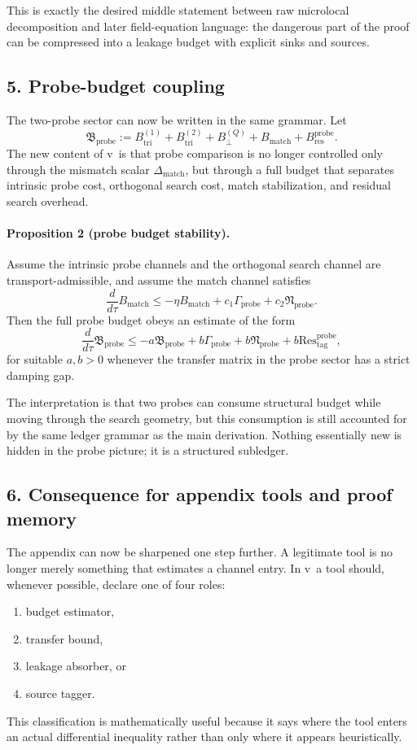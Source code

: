 This is exactly the desired middle statement between raw microlocal decomposition
and later field-equation language: the dangerous part of the proof can be
compressed into a leakage budget with explicit sinks and sources.

\subsection*{5. Probe-budget coupling}
The two-probe sector can now be written in the same grammar. Let
\[
\mathfrak B_{\mathrm{probe}}:=
B_{\mathrm{tri}}^{(1)}+B_{\mathrm{tri}}^{(2)}+B_{\perp}^{(Q)}+B_{\mathrm{match}}+B_{\mathrm{res}}^{\mathrm{probe}}.
\]
The new content of v\docversion\ is that probe comparison is no longer controlled
only through the mismatch scalar $\Delta_{\mathrm{match}}$, but through a full budget
that separates intrinsic probe cost, orthogonal search cost, match stabilization,
and residual search overhead.

\paragraph{Proposition 2 (probe budget stability).}
Assume the intrinsic probe channels and the orthogonal search channel are
transport-admissible, and assume the match channel satisfies
\[
\frac{d}{d\tau}B_{\mathrm{match}}
\le -\eta B_{\mathrm{match}} + c_1\Gamma_{\mathrm{probe}} + c_2\mathfrak N_{\mathrm{probe}}.
\]
Then the full probe budget obeys an estimate of the form
\[
\frac{d}{d\tau}\mathfrak B_{\mathrm{probe}}
\le -a\mathfrak B_{\mathrm{probe}} + b\Gamma_{\mathrm{probe}} + b\mathfrak N_{\mathrm{probe}} + b\mathrm{Res}^{\mathrm{probe}}_{\mathrm{tag}},
\]
for suitable $a,b>0$ whenever the transfer matrix in the probe sector has a
strict damping gap.

The interpretation is that two probes can consume structural budget while moving
through the search geometry, but this consumption is still accounted for by the
same ledger grammar as the main derivation. Nothing essentially new is hidden in
the probe picture; it is a structured subledger.

\subsection*{6. Consequence for appendix tools and proof memory}
The appendix can now be sharpened one step further. A legitimate tool is no longer
merely something that estimates a channel entry. In v\docversion\ a tool should,
whenever possible, declare one of four roles:
\begin{enumerate}[label=(\alph*)]
  \item budget estimator,
  \item transfer bound,
  \item leakage absorber, or
  \item source tagger.
\end{enumerate}
This classification is mathematically useful because it says where the tool enters
an actual differential inequality rather than only where it appears heuristically.

